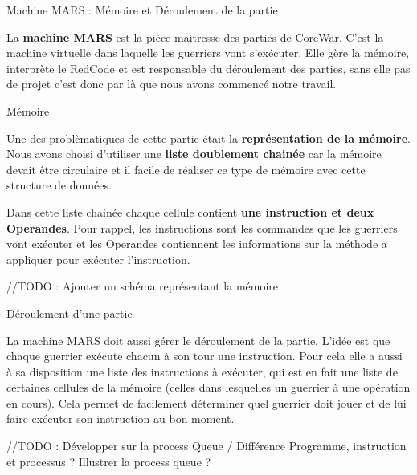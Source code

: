 \documentclass[a4paper, 10pt]{article}
\begin{document}
    \begin{section}{Machine MARS : Mémoire et Déroulement de la partie}
        \par
            La \textbf{machine MARS} est la pièce maitresse des parties de CoreWar. C'est la machine virtuelle dans laquelle les guerriers vont s'exécuter. Elle gère la mémoire, interprète le RedCode et est responsable du déroulement des parties, sans elle pas de projet c'est donc par là que nous avons commencé notre travail. 
            \medskip
        
        \begin{subsection}{Mémoire}
            
            \par
                Une des problèmatiques de cette partie était la \textbf{représentation de la mémoire}.
                Nous avons choisi d'utiliser une \textbf{liste doublement chainée} car la mémoire devait être circulaire et il facile de réaliser ce type de mémoire avec cette structure de données.
                \smallskip
            \par
                Dans cette liste chainée chaque cellule contient \textbf{une instruction et deux Operandes}. Pour rappel, les instructions sont les commandes que les guerriers vont exécuter et les Operandes contiennent les informations sur la méthode a appliquer pour exécuter l'instruction. 
                \medskip
            \par
                //TODO : Ajouter un schéma représentant la mémoire
        \end{subsection}

        \begin{subsection}{Déroulement d'une partie}
            \par
                La machine MARS doit aussi gérer le déroulement de la partie. L'idée est que chaque guerrier exécute chacun à son tour une instruction. Pour cela elle a aussi à sa disposition une liste des instructions à exécuter, qui est en fait une liste de certaines cellules de la mémoire (celles dans lesquelles un guerrier à une opération en cours). Cela permet de facilement déterminer quel guerrier doit jouer et de lui faire exécuter son instruction au bon moment.
            \par
                //TODO : Développer sur la process Queue / Différence Programme, instruction et processus ? Illustrer la process queue ?
        \end{subsection}
        \bigskip
    \end{section}
\end{document}
